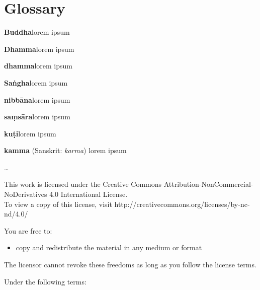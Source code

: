 \documentclass[11pt,openany]{memoir}
\begin{document}


\chapter*{Glossary}
\parindent 0pt
\parskip 4pt

\textbf{Buddha}\hspace{9pt}lorem ipsum

\textbf{Dhamma}\hspace{9pt}lorem ipsum

\textbf{dhamma}\hspace{9pt}lorem ipsum

\textbf{Saṅgha}\hspace{9pt}lorem ipsum

\textbf{nibbāna}\hspace{9pt}lorem ipsum

\textbf{saṃsāra}\hspace{9pt}lorem ipsum

\textbf{kuṭi}\hspace{9pt}lorem ipsum

\textbf{kamma}\hspace{9pt} (Sanskrit: \emph{karma}) lorem ipsum

\ldots{}

\clearpage
\mbox{}
\clearpage
\footnotesize
\begin{center}
This work is licensed under the Creative Commons
Attribution-NonCommercial-NoDerivatives 4.0 International License.\\To
view a copy of this license, visit
http://creativecommons.org/licenses/by-nc-nd/4.0/
\end{center}

You are free to:

\begin{itemize}
\item copy and redistribute the material in any medium or format 
\end{itemize}


The licensor cannot revoke these freedoms as long as you follow the
license terms.

Under the following terms:
\end{document}
